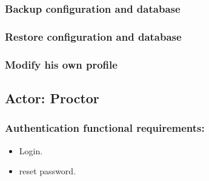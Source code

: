 \documentclass[a4paper,12p]{article}
\begin{document}
     \subsubsection{Backup configuration and database}
     \subsubsection{Restore configuration and database}
     \subsubsection{Modify his own profile}

     \subsection{Actor: Proctor}
     \subsubsection{Authentication functional requirements:}
     \begin{itemize}
         \item Login.
         \item reset password.
     \end{itemize}
\end{document}
